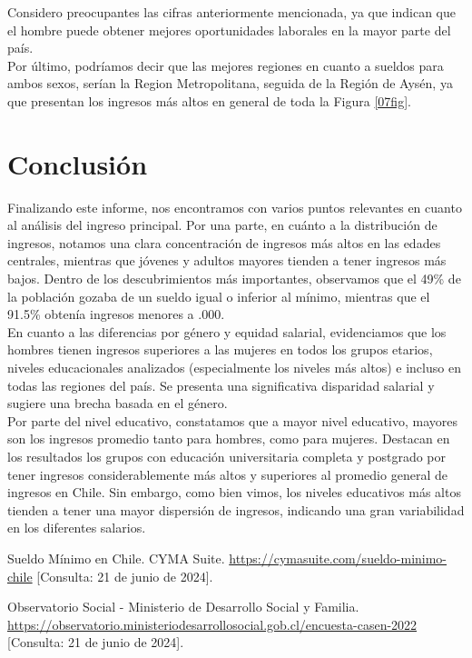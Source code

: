 \documentclass{article}
\begin{document}
	Considero preocupantes las cifras anteriormente mencionada, ya que indican que el hombre puede obtener mejores oportunidades laborales en la mayor parte del país.\\
	
	Por último, podríamos decir que las mejores regiones en cuanto a sueldos para ambos sexos, serían la Region Metropolitana, seguida de la Región de Aysén, ya que presentan los ingresos más altos en general de toda la Figura \ref{07fig}.
	
	\FloatBarrier
	
	\section*{Conclusión}
	
	Finalizando este informe, nos encontramos con varios puntos relevantes en cuanto al análisis del ingreso principal. Por una parte, en cuánto a la distribución de ingresos, notamos una clara concentración de ingresos más altos en las edades centrales, mientras que jóvenes y adultos mayores tienden a tener ingresos más bajos. Dentro de los descubrimientos más importantes, observamos que el 49\% de la población gozaba de un sueldo igual o inferior al mínimo, mientras que el 91.5\% obtenía ingresos menores a .000.\\
	
	En cuanto a las diferencias por género y equidad salarial, evidenciamos que los hombres tienen ingresos superiores a las mujeres en todos los grupos etarios, niveles educacionales analizados (especialmente los niveles más altos) e incluso en todas las regiones del país. Se presenta una significativa disparidad salarial y sugiere una brecha basada en el género.\\
	
	Por parte del nivel educativo, constatamos que a mayor nivel educativo, mayores son los ingresos promedio tanto para hombres, como para mujeres. Destacan en los resultados los grupos con educación universitaria completa y postgrado por tener ingresos considerablemente más altos y superiores al promedio general de ingresos en Chile. Sin embargo, como bien vimos, los niveles educativos más altos tienden a tener una mayor dispersión de ingresos, indicando una gran variabilidad en los diferentes salarios.\\
	
	\newpage
	\begin{thebibliography}{99}
		
		Sueldo Mínimo en Chile.
		CYMA Suite.
		\url{https://cymasuite.com/sueldo-minimo-chile}
		[Consulta: 21 de junio de 2024].
		
		Observatorio Social - Ministerio de Desarrollo Social y Familia.
		\url{https://observatorio.ministeriodesarrollosocial.gob.cl/encuesta-casen-2022}
		[Consulta: 21 de junio de 2024].
		
	\end{thebibliography}
		
\end{document}
